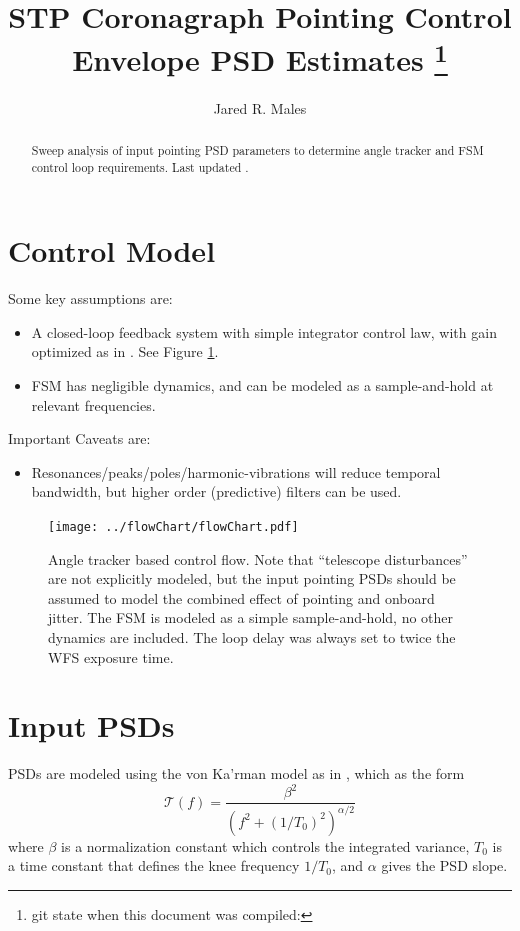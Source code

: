 \documentclass[10pt,preprint]{aastex631}
\begin{document}
\title{STP Coronagraph Pointing Control Envelope PSD Estimates \footnote{git state when this document was compiled: }}

\author{Jared R. Males}

\begin{abstract}
Sweep analysis of input pointing PSD parameters to determine angle tracker and FSM control loop requirements.
Last updated \DTMnow.
\end{abstract}

\section{Control Model}

Some key assumptions are:
\begin{itemize}
\item A closed-loop feedback system with simple integrator control law, with gain optimized as in \citet{2018JATIS...4a9001M}.  See Figure \ref{fig:flowChart}.
\item FSM has negligible dynamics, and can be modeled as a sample-and-hold at relevant frequencies.
\end{itemize}

Important Caveats are:
\begin{itemize}
\item Resonances/peaks/poles/harmonic-vibrations will reduce temporal bandwidth, but higher order (predictive) filters can be used.  \\
\end{itemize}

\begin{figure}
\centering
\texttt{[image: ../flowChart/flowChart.pdf]}
\vspace{-3cm}
\caption{Angle tracker based control flow.  Note that ``telescope disturbances'' are not explicitly modeled, but the input pointing PSDs should be assumed to model the combined effect of pointing and onboard jitter.  The FSM is modeled as a simple sample-and-hold, no other dynamics are included.  The loop delay was always set to twice the WFS exposure time.  \label{fig:flowChart}}
\end{figure}


\section{Input PSDs}

PSDs are modeled using the von Ka'rman model as in \citet{2019AJ....157...36D}, which as the form
\begin{equation}
\mathcal{T}(f) = \frac{\beta^2}{\left(f^2 + (1/T_0)^2\right)^{\alpha/2}}
\label{eqn:vkpsd}
\end{equation}
where $\beta$ is a normalization constant which controls the integrated variance, $T_0$ is a time constant that defines the knee frequency $1/T_0$, and $\alpha$ gives the PSD slope.
\end{document}
